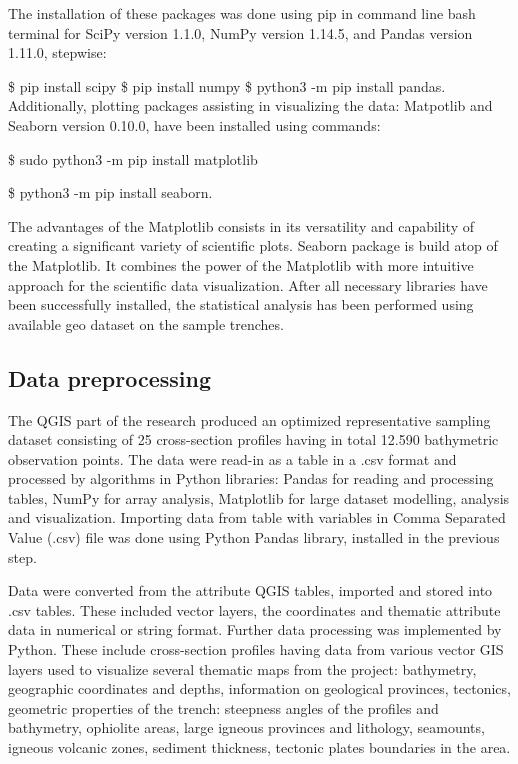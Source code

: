 \documentclass[11pt,a4paper]{report}
\begin{document}
{The installation of these packages was done using pip in command line \ac{bash} terminal for \ac{SciPy} version 1.1.0, \ac{NumPy} version 1.14.5, and Pandas version 1.11.0, stepwise: 

\$ pip install scipy \$ pip install numpy \$ python3 -m pip install pandas. \\
Additionally, plotting packages assisting in visualizing the data: Matpotlib and Seaborn version 0.10.0, have been installed using commands: 

\$ sudo python3 -m pip install matplotlib 

\$ python3 -m pip install seaborn. 

The advantages of the Matplotlib consists in its versatility and capability of creating a significant variety of scientific plots. Seaborn package is build atop of the Matplotlib. It combines the power of the Matplotlib with more intuitive approach for the scientific data visualization. After all necessary libraries have been successfully installed, the statistical analysis has been performed using available geo dataset on the sample trenches. 

\subsection{Data preprocessing}\label{ssec:PyD}
The \ac{QGIS} part of the research produced an optimized representative sampling dataset consisting of 25 cross-section profiles having in total 12.590 bathymetric observation points. The data were read-in as a table in a .csv format and processed by algorithms in Python libraries: Pandas for reading and processing tables, \ac{NumPy} for array analysis, Matplotlib for large dataset modelling, analysis and visualization. Importing data from table with variables in Comma Separated Value (.csv) file was done using Python Pandas library, installed in the previous step. 

Data were converted from the attribute \ac{QGIS} tables, imported and stored into .csv tables. These included vector layers, the coordinates and thematic attribute data in numerical or string format. Further data processing was implemented by Python. These include cross-section profiles having data from various vector \ac{GIS} layers used to visualize several thematic maps from the project: bathymetry, geographic coordinates and depths, information on geological provinces, tectonics, geometric properties of the trench: steepness angles of the profiles and bathymetry, ophiolite areas, large igneous provinces and lithology, seamounts, igneous volcanic zones, sediment thickness, tectonic plates boundaries in the area. 

}
\end{document}
